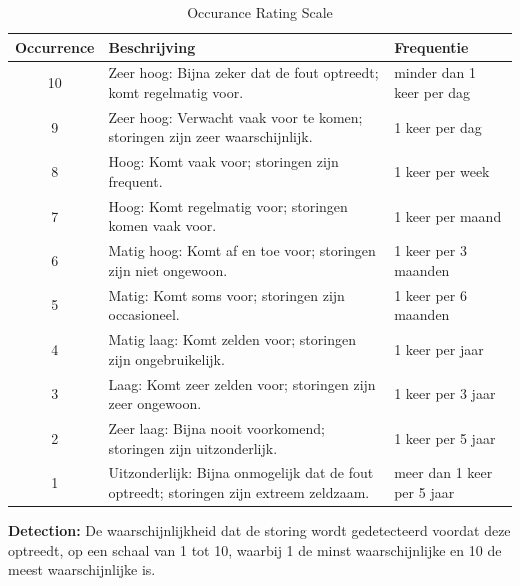\documentclass{article}
\begin{document}
\begin{table}[h!]
  \centering
  \begin{tabular}{|c|p{6.5cm}|p{6.5cm}|}
    \hline
    \textbf{Occurrence} & \textbf{Beschrijving} & \textbf{Frequentie}\\ 
    \hline
      10 
    & Zeer hoog: Bijna zeker dat de fout optreedt; komt regelmatig voor.	&
    minder dan 1 keer per dag\\
    \hline
    9&
    Zeer hoog: Verwacht vaak voor te komen; storingen zijn zeer waarschijnlijk.	&
    1 keer per dag\\
    \hline
    8&
    Hoog: Komt vaak voor; storingen zijn frequent.	&
    1 keer per week\\
    \hline
    7&
    Hoog: Komt regelmatig voor; storingen komen vaak voor.	&
    1 keer per maand\\
    \hline
    6&
    Matig hoog: Komt af en toe voor; storingen zijn niet ongewoon.	&
    1 keer per 3 maanden\\
    \hline
    5&
    Matig: Komt soms voor; storingen zijn occasioneel.	&
    1 keer per 6 maanden\\
    \hline
    4&
    Matig laag: Komt zelden voor; storingen zijn ongebruikelijk.	&
    1 keer per jaar\\
    \hline
    3	&
    Laag: Komt zeer zelden voor; storingen zijn zeer ongewoon.	&
    1 keer per 3 jaar\\
    \hline
    2	&
    Zeer laag: Bijna nooit voorkomend; storingen zijn uitzonderlijk.	&
    1 keer per 5 jaar\\
    \hline
    1	&
    Uitzonderlijk: Bijna onmogelijk dat de fout optreedt; storingen zijn extreem zeldzaam.	&
    meer dan 1 keer per 5 jaar\\
    \hline
  \end{tabular}
\caption{Occurance Rating Scale}
\label{tab:Occurance}
\end{table}

\newpage
\textbf{Detection:} De waarschijnlijkheid dat de storing wordt gedetecteerd voordat deze optreedt, op een schaal van 1 tot 10, waarbij 1 de minst waarschijnlijke en 10 de meest waarschijnlijke is.
\end{document}
